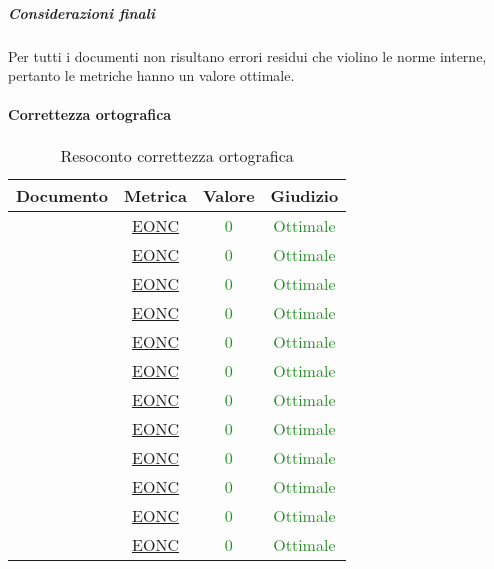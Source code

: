 						\subparagraph{Considerazioni finali}
							Per tutti i documenti non risultano errori residui che violino le norme interne, pertanto le metriche hanno un valore ottimale.
						
						
				\paragraph{Correttezza ortografica}
					\begin{table}[H]
						\centering
						\small
						\begin{tabular}{c | c | c | c}
							\hline
							\textbf{Documento} & \textbf{Metrica} & \textbf{Valore} & \textbf{Giudizio} \\
							\hline
							\pdpv & \hyperref[MCO]{EONC} & \textcolor{ForestGreen}{0} & \textcolor{ForestGreen}{Ottimale} \\
							\pdqv & \hyperref[MCO]{EONC} & \textcolor{ForestGreen}{0} & \textcolor{ForestGreen}{Ottimale}\\
							\ndpv & \hyperref[MCO]{EONC} &\textcolor{ForestGreen}{0} & \textcolor{ForestGreen}{Ottimale}\\
							\sdfv & \hyperref[MCO]{EONC} & \textcolor{ForestGreen}{0} & \textcolor{ForestGreen}{Ottimale}\\
							\adrv & \hyperref[MCO]{EONC} & \textcolor{ForestGreen}{0} & \textcolor{ForestGreen}{Ottimale}\\
							\glv  & \hyperref[MCO]{EONC} & \textcolor{ForestGreen}{0} & \textcolor{ForestGreen}{Ottimale}\\
							\vunoi& \hyperref[MAANI]{EONC} & \textcolor{ForestGreen}{0} & \textcolor{ForestGreen}{Ottimale}\\
							\vduei& \hyperref[MAANI]{EONC} & \textcolor{ForestGreen}{0} & \textcolor{ForestGreen}{Ottimale}\\
							\vtrei & \hyperref[MAANI]{EONC} & \textcolor{ForestGreen}{0} & \textcolor{ForestGreen}{Ottimale}\\
							\vquattroi & \hyperref[MAANI]{EONC} & \textcolor{ForestGreen}{0} & \textcolor{ForestGreen}{Ottimale}\\
							\vunoe & \hyperref[MAANI]{EONC} & \textcolor{ForestGreen}{0} & \textcolor{ForestGreen}{Ottimale}\\
							\vduee & \hyperref[MAANI]{EONC} & \textcolor{ForestGreen}{0} & \textcolor{ForestGreen}{Ottimale}\\
							\hline
						\end{tabular}
						\caption{Resoconto correttezza ortografica}
						\label{tab_resoconto_correttezza_ortografica}
					\end{table}
					
